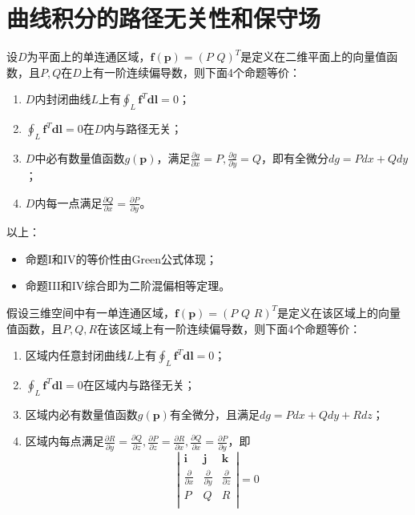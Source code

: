 \section{曲线积分的路径无关性和保守场}

\begin{theorem}
设$D$为平面上的单连通区域，$\boldsymbol{f}\left( \boldsymbol{p} \right) =\left( P\,\,Q \right) ^T$是定义在二维平面上的向量值函数，且$P,Q$在$D$上有一阶连续偏导数，则下面4个命题等价：
\begin{enumerate}[label=\Roman*.]
    \item $D$内封闭曲线$L$上有$\oint_L{\boldsymbol{f}^T\boldsymbol{dl}}=0$；
    \item $\oint_L{\boldsymbol{f}^T\boldsymbol{dl}}=0$在$D$内与路径无关；
    \item $D$中必有数量值函数$g\left( \boldsymbol{p} \right) $，满足$\frac{\partial g}{\partial x}=P,\frac{\partial g}{\partial y}=Q$，即有全微分$dg=Pdx+Qdy$；
    \item $D$内每一点满足$\frac{\partial Q}{\partial x}=\frac{\partial P}{\partial y}$。
\end{enumerate}
\end{theorem}

以上：
\begin{itemize}
    \item 命题I和IV的等价性由Green公式体现；
    \item 命题III和IV综合即为二阶混偏相等定理。
\end{itemize}

\begin{theorem}
假设三维空间中有一单连通区域，$\boldsymbol{f}\left( \boldsymbol{p} \right) =\left( P\,\,Q\,\,R \right) ^T$是定义在该区域上的向量值函数，且$P,Q,R$在该区域上有一阶连续偏导数，则下面4个命题等价：
\begin{enumerate}[label=\Roman*.]
    \item 区域内任意封闭曲线$L$上有$\oint_L{\boldsymbol{f}^T\boldsymbol{dl}}=0$；
    \item $\oint_L{\boldsymbol{f}^T\boldsymbol{dl}}=0$在区域内与路径无关；
    \item 区域内必有数量值函数$g\left( \boldsymbol{p} \right) $有全微分，且满足$dg=Pdx+Qdy+Rdz$；
    \item 区域内每点满足$\frac{\partial R}{\partial y}=\frac{\partial Q}{\partial z},\frac{\partial P}{\partial z}=\frac{\partial R}{\partial x},\frac{\partial Q}{\partial x}=\frac{\partial P}{\partial y}$，即
    \[
    \left| \begin{matrix}
    	\mathbf{i}&		\mathbf{j}&		\mathbf{k}\\
    	\frac{\partial}{\partial x}&		\frac{\partial}{\partial y}&		\frac{\partial}{\partial z}\\
    	P&		Q&		R\\
    \end{matrix} \right|=0
    \]
\end{enumerate}
\end{theorem}

